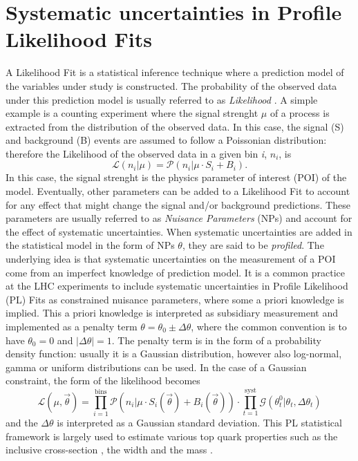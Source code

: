 \documentclass[12pt]{article}
\begin{document}
\section{Systematic uncertainties in Profile Likelihood Fits}
A Likelihood Fit is a statistical inference technique where a prediction model of the variables under study is constructed. The probability of the observed data under this prediction model is usually referred to as \emph{Likelihood} \cite{kCranmer}.
A simple example is a counting experiment where the signal strenght $\mu$ of a process is extracted from the distribution of the observed data. In this case, the signal (S) and background (B) events are assumed to follow a Poissonian distribution: therefore the Likelihood of the observed data in a given bin \emph{i}, $n_i$, is
\begin{equation}
\mathcal{L}(n_i|\mu) = \mathcal{P}(n_i|\mu\cdot S_i+B_i).
\end{equation}
In this case, the signal strenght is the physics parameter of interest (POI) of the model. Eventually, other parameters can be added to a Likelihood Fit to account for any effect that might change the signal and/or background predictions. 
These parameters are usually referred to as \emph{Nuisance Parameters} (NPs) and account for the effect of systematic uncertainties. When systematic uncertainties are added in the statistical model in the form of NPs $\theta$, they are said to be \emph{profiled}. The underlying idea is that systematic uncertainties on the measurement of a POI come from an imperfect knowledge of prediction model. It is a common practice at the LHC experiments to include systematic uncertainties in Profile Likelihood (PL) Fits as constrained nuisance parameters, where some a priori knowledge is implied. This a priori knowledge is interpreted as subsidiary measurement and implemented as a penalty term $\theta = \theta_0\pm\Delta\theta$, where the common convention is to have $\theta_0 = 0$ and $|\Delta\theta| =1$. The penalty term is in the form of a probability density function: usually it is a Gaussian distribution, however also log-normal, gamma or uniform distributions can be used. 
In the case of a Gaussian constraint, the form of the likelihood becomes 
\begin{equation}
\mathcal{L}(\mu,\vec{\theta}) = \displaystyle\prod_{i=1}^{\mathrm{bins}}\mathcal{P}(n_i|\mu\cdot S_i(\vec{\theta})+B_i(\vec{\theta}))\cdot\displaystyle\prod_{t=1}^{\mathrm{syst}}\mathcal{G}(\theta_t^0|\theta_t,\Delta\theta_t)
\end{equation}
and the $\Delta\theta$ is interpreted as a Gaussian standard deviation.
This PL statistical framework is largely used to estimate various top quark properties such as the inclusive cross-section \cite{Aad_2020,CMS_inclusive}, the width \cite{ATLAS:2019onj} and the mass \cite{CMS_inclusive}.
\end{document}
